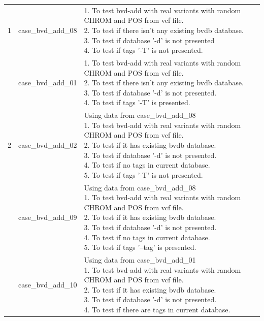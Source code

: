 \documentclass[a4paper,11pt]{kth-mag}
\begin{document}
\begin{longtable}{|c|l|l|}
\multirow{1}{*}{1} 
	& case\_bvd\_add\_08 & 
	\specialcell{1. To test bvd-add with real variants with random CHROM and POS from vcf file. \\
		2. To test if there isn't any existing bvdb database.\\
		3. To test if database '-d' is not presented\\
		4. To test if tags '-T' is not presented.} \\ \cline{2-3}
	& case\_bvd\_add\_01 & 
	\specialcell{1. To test bvd-add with real variants with random CHROM and POS from vcf file. \\
		2. To test if there isn't any existing bvdb database. \\
		3. To test if database '-d' is not presented. \\
		4. To test if tags '-T' is presented.} \\
\hline
\multirow{1}{*}{2} 
	& case\_bvd\_add\_02 & 
	\specialcell{Using data from case\_bvd\_add\_08 \\
		1. To test bvd-add with real variants with random CHROM and POS from vcf file. \\
		2. To test if it has existing bvdb database. \\
		3. To test if database '-d' is not presented. \\
		4. To test if no tags in current database. \\
		5. To test if tags '-T' is not presented.} \\ \cline{2-3}
	& case\_bvd\_add\_09 & 
	\specialcell{Using data from case\_bvd\_add\_08\\
		1. To test bvd-add with real variants with random CHROM and POS from vcf file. \\
		2. To test if it has existing bvdb database.\\
		3. To test if database '-d' is not presented.\\
		4. To test if no tags in current database.\\
		5. To test if tags '--tag' is presented.} \\ \cline{2-3}
	& case\_bvd\_add\_10 & 
	\specialcell{Using data from case\_bvd\_add\_01\\
		1. To test bvd-add with real variants with random CHROM and POS from vcf file. \\
		2. To test if it has existing bvdb database.\\
		3. To test if database '-d' is not presented.\\
		4. To test if there are tags in current database.\\
}
\end{longtable}
\end{document}
